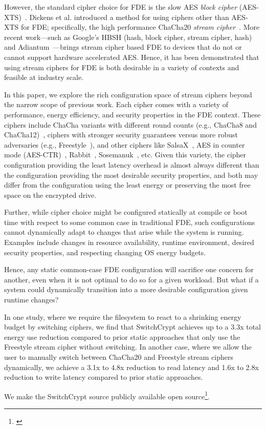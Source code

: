 However, the standard cipher choice for FDE is the slow AES \emph{block cipher}
(AES-XTS)~\cite{XTS, XTSComments, NISTXTS}. Dickens et al. introduced a method
for using ciphers other than AES-XTS for FDE; specifically, the high performance
ChaCha20 \emph{stream cipher}~\cite{StrongBox, ChaCha20}. More recent
work---such as Google's HBSH (hash, block cipher, stream cipher, hash) and
Adiantum~\cite{Adiantum}---brings stream cipher based FDE to devices that do not
or cannot support hardware accelerated AES. Hence, it has been demonstrated that
using stream ciphers for FDE is both desirable in a variety of contexts and
feasible at industry scale.

In this paper, we explore the rich configuration space of stream ciphers beyond
the narrow scope of previous work. Each cipher comes with a variety of
performance, energy efficiency, and security properties in the FDE context.
These ciphers include ChaCha variants with different round counts (e.g.,
ChaCha8 and ChaCha12)~\cite{ChaCha20}, ciphers with stronger security
guarantees versus more robust adversaries (e.g., Freestyle~\cite{Freestyle}),
and other ciphers like SalsaX~\cite{SalsaX}, AES in counter mode
(AES-CTR)~\cite{AESCTR}, Rabbit~\cite{Rabbit}, Sosemanuk~\cite{Sosemanuk}, etc.
Given this variety, the cipher configuration providing the least latency
overhead is almost always different than the configuration providing the most
desirable security properties, and both may differ from the configuration using
the least energy or preserving the most free space on the encrypted drive.

Further, while cipher choice might be configured statically at compile or boot
time with respect to some common case in traditional FDE, such configurations
cannot dynamically adapt to changes that arise while the system is running.
Examples include changes in resource availability, runtime environment, desired
security properties, and respecting changing OS energy budgets.

Hence, any static common-case FDE configuration will sacrifice one concern for
another, even when it is not optimal to do so for a given workload. But what if
a system could dynamically transition into a more desirable configuration given
runtime changes?

In one study, where we require the filesystem to react to a shrinking energy
budget by switching ciphers, we find that SwitchCrypt achieves up to a 3.3x
total energy use reduction compared to prior static approaches that only use the
Freestyle stream cipher without switching. In another case, where we allow the
user to manually switch between ChaCha20 and Freestyle stream ciphers
dynamically, we achieve a 3.1x to 4.8x reduction to read latency and 1.6x to
2.8x reduction to write latency compared to prior static approaches.

We make the SwitchCrypt source publicly available open
source\footnote{\label{note1}\SystemURI}.
